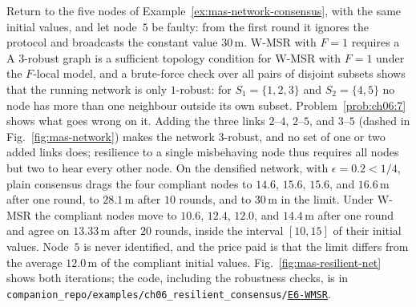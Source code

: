\documentclass[graybox,envcountchap]{style/SNmono}
\newcommand{\repopath}[1]{\texttt{#1}}
\providecommand{\DIFadd}[1]{{\protect\color{blue} #1}} %
\providecommand{\DIFdel}[1]{{\protect\color{red} #1}} %
\providecommand{\DIFaddbegin}{} %
\providecommand{\DIFaddend}{} %
\providecommand{\DIFdelbegin}{} %
\providecommand{\DIFdelend}{} %
\DeclareRobustCommand{\RtwoDel}[1]{{\color{red}%
  \renewcommand{\DIFadd}[1]{##1}\renewcommand{\DIFdel}[1]{##1}%
  #1}}
\DeclareRobustCommand{\RtwoAdd}[1]{{\color{blue}#1}}
\DeclareRobustCommand{\codeentry}[1]{\hyperref[code:#1]{\texttt{#1}}}
\begin{document}
\begin{example}
\label{ex:mas-resilient-net}
Return to the five nodes of Example~\ref{ex:mas-network-consensus}, with the same initial values, and let node~$5$ be faulty: from the first round it ignores the protocol and broadcasts the constant value $30$\,m. \DIFdelbegin \DIFdel{W-MSR with $F=1$ requires a }\DIFdelend \DIFaddbegin \DIFadd{A }\DIFaddend $3$-robust graph \DIFaddbegin \DIFadd{is a sufficient topology condition for W-MSR with $F=1$ under the $F$-local model}\DIFaddend , and a brute-force check over all pairs of disjoint subsets shows that the running network is only $1$-robust: for $S_1=\{1,2,3\}$ and $S_2=\{4,5\}$ no node has more than one neighbour outside its own subset. Problem~\ref{prob:ch06:7} shows what goes wrong on it. Adding the three links $2$--$4$, $2$--$5$, and $3$--$5$ (dashed in Fig.~\ref{fig:mas-network}) makes the network $3$-robust, and no set of one or two added links does; resilience to a single misbehaving node thus requires all nodes but two to hear every other node. On the densified network, with $\epsilon=0.2<1/4$, plain consensus drags the four compliant nodes to $14.6$, $15.6$, $15.6$, and $16.6$\,m after one round, to $28.1$\,m after $10$ rounds, and to $30$\,m in the limit. Under W-MSR the compliant nodes move to $10.6$, $12.4$, $12.0$, and $14.4$\,m after one round and agree on $13.33$\,m after $20$ rounds, inside the interval $[10,15]$ of their initial values. Node~$5$ is never identified, and the price paid is that the limit differs from the average $12.0$\,m of the compliant initial values. Fig.~\ref{fig:mas-resilient-net} shows both iterations; the code, including the robustness checks, is in \RtwoDel{\repopath{companion\_\allowbreak repo/\allowbreak examples/\allowbreak ch06\_\allowbreak resilient\_\allowbreak consensus/\allowbreak }}\RtwoAdd{\codeentry{E6-WMSR}}.
\end{example}
\end{document}

